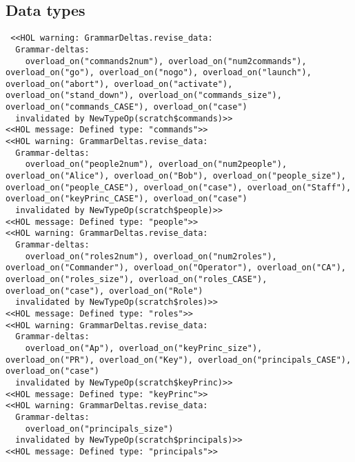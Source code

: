 \documentclass{report}
\begin{document}
\subsection{Data types}
\label{op-14-1}
\begin{session}
  \begin{scriptsize}
\begin{verbatim}
 <<HOL warning: GrammarDeltas.revise_data: 
  Grammar-deltas:
    overload_on("commands2num"), overload_on("num2commands"), overload_on("go"), overload_on("nogo"), overload_on("launch"), overload_on("abort"), overload_on("activate"), overload_on("stand_down"), overload_on("commands_size"), overload_on("commands_CASE"), overload_on("case")
  invalidated by NewTypeOp(scratch$commands)>>
<<HOL message: Defined type: "commands">>
<<HOL warning: GrammarDeltas.revise_data: 
  Grammar-deltas:
    overload_on("people2num"), overload_on("num2people"), overload_on("Alice"), overload_on("Bob"), overload_on("people_size"), overload_on("people_CASE"), overload_on("case"), overload_on("Staff"), overload_on("keyPrinc_CASE"), overload_on("case")
  invalidated by NewTypeOp(scratch$people)>>
<<HOL message: Defined type: "people">>
<<HOL warning: GrammarDeltas.revise_data: 
  Grammar-deltas:
    overload_on("roles2num"), overload_on("num2roles"), overload_on("Commander"), overload_on("Operator"), overload_on("CA"), overload_on("roles_size"), overload_on("roles_CASE"), overload_on("case"), overload_on("Role")
  invalidated by NewTypeOp(scratch$roles)>>
<<HOL message: Defined type: "roles">>
<<HOL warning: GrammarDeltas.revise_data: 
  Grammar-deltas:
    overload_on("Ap"), overload_on("keyPrinc_size"), overload_on("PR"), overload_on("Key"), overload_on("principals_CASE"), overload_on("case")
  invalidated by NewTypeOp(scratch$keyPrinc)>>
<<HOL message: Defined type: "keyPrinc">>
<<HOL warning: GrammarDeltas.revise_data: 
  Grammar-deltas:
    overload_on("principals_size")
  invalidated by NewTypeOp(scratch$principals)>>
<<HOL message: Defined type: "principals">>
\end{verbatim}
  \end{scriptsize}
\end{session}
\end{document}
